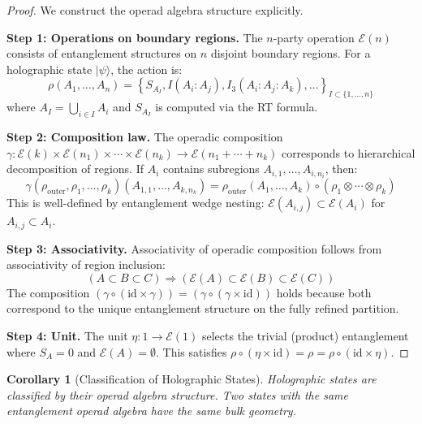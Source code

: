 \documentclass[12pt,a4paper]{article}
\newtheorem{corollary}[theorem]{Corollary}
\begin{document}
\begin{proof}
We construct the operad algebra structure explicitly.

\textbf{Step 1: Operations on boundary regions.}
The $n$-party operation $\mathcal{E}(n)$ consists of entanglement structures on $n$ disjoint boundary regions. For a holographic state $|\psi\rangle$, the action is:
\begin{equation}
\rho(A_1, \ldots, A_n) = \left\{ S_{A_I}, I(A_i : A_j), I_3(A_i : A_j : A_k), \ldots \right\}_{I \subset \{1,\ldots,n\}}
\end{equation}
where $A_I = \bigcup_{i \in I} A_i$ and $S_{A_I}$ is computed via the RT formula.

\textbf{Step 2: Composition law.}
The operadic composition $\gamma: \mathcal{E}(k) \times \mathcal{E}(n_1) \times \cdots \times \mathcal{E}(n_k) \to \mathcal{E}(n_1 + \cdots + n_k)$ corresponds to hierarchical decomposition of regions. If $A_i$ contains subregions $A_{i,1}, \ldots, A_{i,n_i}$, then:
\begin{equation}
\gamma(\rho_{\text{outer}}, \rho_1, \ldots, \rho_k)(A_{1,1}, \ldots, A_{k,n_k}) = \rho_{\text{outer}}(A_1, \ldots, A_k) \circ (\rho_1 \otimes \cdots \otimes \rho_k)
\end{equation}
This is well-defined by entanglement wedge nesting: $\mathcal{E}(A_{i,j}) \subset \mathcal{E}(A_i)$ for $A_{i,j} \subset A_i$.

\textbf{Step 3: Associativity.}
Associativity of operadic composition follows from associativity of region inclusion:
\begin{equation}
(A \subset B \subset C) \Rightarrow (\mathcal{E}(A) \subset \mathcal{E}(B) \subset \mathcal{E}(C))
\end{equation}
The composition $(\gamma \circ (\text{id} \times \gamma)) = (\gamma \circ (\gamma \times \text{id}))$ holds because both correspond to the unique entanglement structure on the fully refined partition.

\textbf{Step 4: Unit.}
The unit $\eta: 1 \to \mathcal{E}(1)$ selects the trivial (product) entanglement where $S_A = 0$ and $\mathcal{E}(A) = \emptyset$. This satisfies $\rho \circ (\eta \times \text{id}) = \rho = \rho \circ (\text{id} \times \eta)$.
\end{proof}

\begin{corollary}[Classification of Holographic States]
Holographic states are classified by their operad algebra structure. Two states with the same entanglement operad algebra have the same bulk geometry.
\end{corollary}
\end{document}
